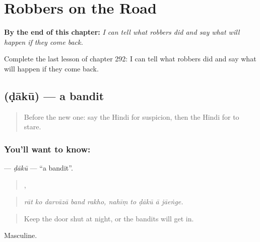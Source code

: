 
\chapter{Robbers on the Road}
\label{ch:hi-robbers-on-the-road}

\begin{chapteropening}
\textbf{By the end of this chapter:} \emph{I can tell what robbers did and say what will happen if they come back.}

Complete the last lesson of chapter 292: I can tell what robbers did and say what will happen if they come back.
\end{chapteropening}

\section[\texorpdfstring{\hi{डाकू} (ḍākū)}{डाकू (ḍākū)}]{ (ḍākū) — a bandit}

\label{lesson:HI-C292-daku}



\begin{quote}
Before the new one: say the Hindi for suspicion, then the Hindi for to stare.
\end{quote}

\subsection*{You'll want to know: }
\textbf{} — \emph{ḍākū} — \textquotedblleft{}a bandit\textquotedblright{}.

\begin{quote}
    ,     
\end{quote}

\begin{quote}
\emph{rāt ko darvāzā band rakho, nahīṃ to ḍākū ā jāeṅge.}
\end{quote}

\begin{quote}
Keep the door shut at night, or the bandits will get in.
\end{quote}

Masculine.

